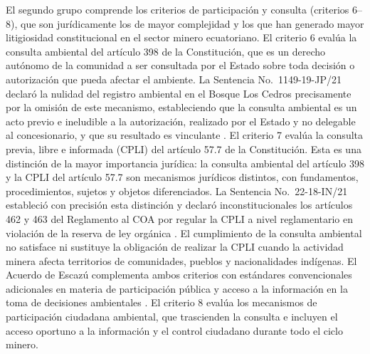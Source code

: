 El segundo grupo comprende los criterios de participación y consulta (criterios 6--8), que son jurídicamente los de mayor complejidad y los que han generado mayor litigiosidad constitucional en el sector minero ecuatoriano. El criterio 6 evalúa la consulta ambiental del artículo 398 de la Constitución, que es un derecho autónomo de la comunidad a ser consultada por el Estado sobre toda decisión o autorización que pueda afectar el ambiente. La Sentencia No.\ 1149-19-JP/21 declaró la nulidad del registro ambiental en el Bosque Los Cedros precisamente por la omisión de este mecanismo, estableciendo que la consulta ambiental es un acto previo e ineludible a la autorización, realizado por el Estado y no delegable al concesionario, y que su resultado es vinculante \parencite{cce_1149_19_jp_21}. El criterio 7 evalúa la consulta previa, libre e informada (CPLI) del artículo 57.7 de la Constitución. Esta es una distinción de la mayor importancia jurídica: la consulta ambiental del artículo 398 y la CPLI del artículo 57.7 son mecanismos jurídicos distintos, con fundamentos, procedimientos, sujetos y objetos diferenciados. La Sentencia No.\ 22-18-IN/21 estableció con precisión esta distinción y declaró inconstitucionales los artículos 462 y 463 del Reglamento al COA por regular la CPLI a nivel reglamentario en violación de la reserva de ley orgánica \parencite{cce_22_18_in_21}. El cumplimiento de la consulta ambiental no satisface ni sustituye la obligación de realizar la CPLI cuando la actividad minera afecta territorios de comunidades, pueblos y nacionalidades indígenas. El Acuerdo de Escazú complementa ambos criterios con estándares convencionales adicionales en materia de participación pública y acceso a la información en la toma de decisiones ambientales \parencite{acuerdo_escazu_2018,cepal_ruta_escazu_2023}. El criterio 8 evalúa los mecanismos de participación ciudadana ambiental, que trascienden la consulta e incluyen el acceso oportuno a la información y el control ciudadano durante todo el ciclo minero.

